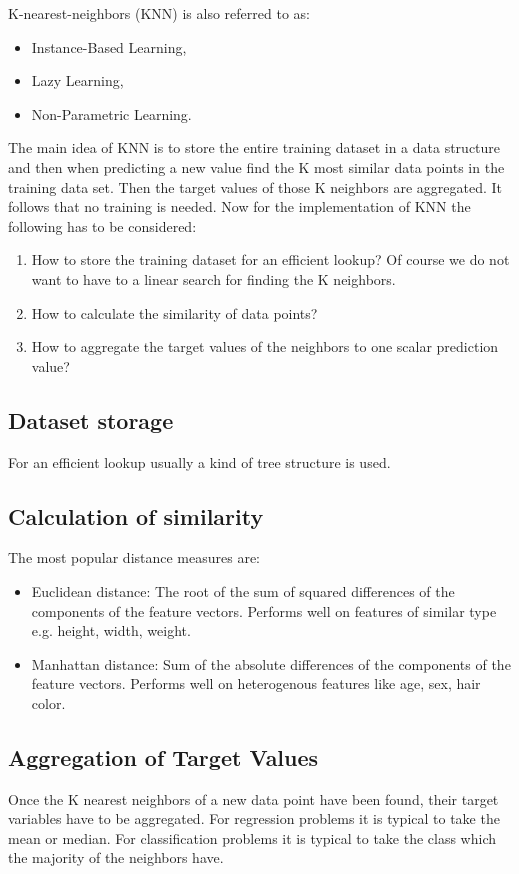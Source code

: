 K-nearest-neighbors (KNN) is also referred to as:

\begin{itemize}
    \item Instance-Based Learning,
    \item Lazy Learning,
    \item Non-Parametric Learning.
\end{itemize}

The main idea of KNN is to store the entire training dataset in a data structure and then when predicting a new value find the K most similar data points in the training data set. Then the target values of those K neighbors are aggregated. It follows that no training is needed. Now for the implementation of KNN the following has to be considered:

\begin{enumerate}
    \item How to store the training dataset for an efficient lookup? Of course we do not want to have to a linear search for finding the K neighbors.
    \item How to calculate the similarity of data points?
    \item How to aggregate the target values of the neighbors to one scalar prediction value?
\end{enumerate}

\subsection*{Dataset storage}

For an efficient lookup usually a kind of tree structure is used.

\subsection*{Calculation of similarity}

The most popular distance measures are:
\begin{itemize}
    \item Euclidean distance: The root of the sum of squared differences of the components of the feature vectors. Performs well on features of similar type e.g. height, width, weight.
    \item Manhattan distance: Sum of the absolute differences of the components of the feature vectors. Performs well on heterogenous features like age, sex, hair color.
\end{itemize}

\subsection*{Aggregation of Target Values}
Once the K nearest neighbors of a new data point have been found, their target variables have to be aggregated. For regression problems it is typical to take the mean or median. For classification problems it is typical to take the class which the majority of the neighbors have.
